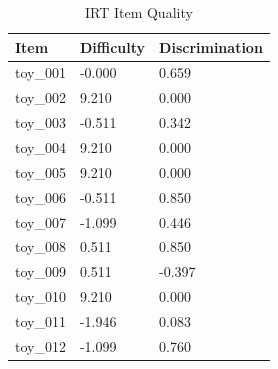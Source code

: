 \begin{table}[t]
\centering
\caption{IRT Item Quality}
\begin{tabular}{lll}
\toprule
Item & Difficulty & Discrimination \\
\midrule
toy\_001 & -0.000 & 0.659 \\
toy\_002 & 9.210 & 0.000 \\
toy\_003 & -0.511 & 0.342 \\
toy\_004 & 9.210 & 0.000 \\
toy\_005 & 9.210 & 0.000 \\
toy\_006 & -0.511 & 0.850 \\
toy\_007 & -1.099 & 0.446 \\
toy\_008 & 0.511 & 0.850 \\
toy\_009 & 0.511 & -0.397 \\
toy\_010 & 9.210 & 0.000 \\
toy\_011 & -1.946 & 0.083 \\
toy\_012 & -1.099 & 0.760 \\
\bottomrule
\end{tabular}
\end{table}
